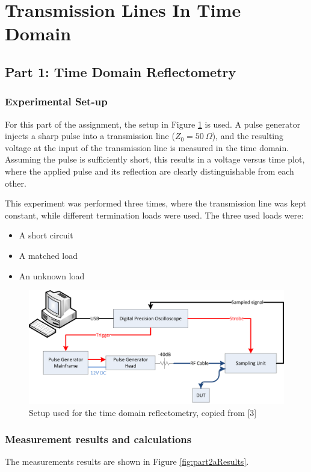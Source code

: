 \documentclass[11pt,a4paper]{article}
\begin{document}
\section{Transmission Lines In Time Domain}

\subsection{Part 1: Time Domain Reflectometry}
\subsubsection{Experimental Set-up}
For this part of the assignment, the setup in Figure \ref{fig:opstelling2a} is used.
A pulse generator injects a sharp pulse into a transmission line ($Z_0 = 50 \ \Omega$),
and the resulting voltage at the input of the transmission line is measured in the time domain.
Assuming the pulse is sufficiently short, this results in a voltage versus time plot,
where the applied pulse and its reflection are clearly distinguishable from each other.

This experiment was performed three times, where the transmission line was kept constant, while different termination loads were used.
The three used loads were:

\begin{itemize}
\item A short circuit
\item A matched load
\item An unknown load
\end{itemize}

\begin{figure}
\includegraphics[scale=1]{opstelling2a.png}
\caption{Setup used for the time domain reflectometry, copied from [3]}\label{fig:opstelling2a}
\end{figure}

\subsubsection{Measurement results and calculations}
The measurements results are shown in Figure \ref{fig:part2aResults}.
\end{document}
